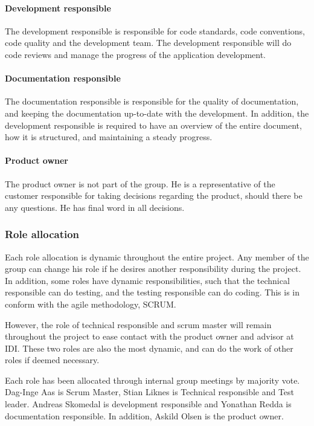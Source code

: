 \paragraph{\textbf{Development responsible}}
The development responsible is responsible for code standards, code conventions, code quality and the development team. The development responsible will do code reviews and manage the progress of the application development.

\paragraph{\textbf{Documentation responsible}}
The documentation responsible is responsible for the quality of documentation, and keeping the documentation up-to-date with the development. In addition, the development responsible is required to have an overview of the entire document, how it is structured, and maintaining a steady progress.

\paragraph{\textbf{Product owner}}
The product owner is not part of the group. He is a representative of the customer responsible for taking decisions regarding the product, should there be any questions. He has final word in all decisions.

\subsubsection{Role allocation}
Each role allocation is dynamic throughout the entire project. Any member of the group can change his role if he desires another responsibility during the project. In addition, some roles have dynamic responsibilities, such that the technical responsible can do testing, and the testing responsible can do coding. This is in conform with the agile methodology, SCRUM.

However, the role of technical responsible and scrum master will remain throughout the project to ease contact with the product owner and advisor at IDI. These two roles are also the most dynamic, and can do the work of other roles if deemed necessary.

Each role has been allocated through internal group meetings by majority vote. Dag-Inge Aas is Scrum Master, Stian Liknes is Technical responsible and Test leader. Andreas Skomedal is development responsible and Yonathan Redda is documentation responsible. In addition, Askild Olsen is the product owner.
